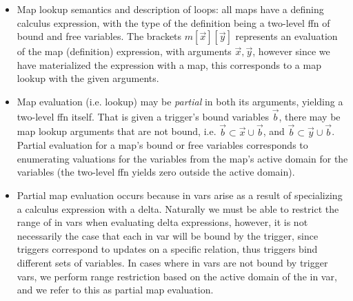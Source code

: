 
\begin{itemize}
  \item Map lookup semantics and description of loops: all maps have a defining
  calculus expression, with the type of the definition being a two-level ffn of
  bound and free variables. The brackets $m[\vec{x}][\vec{y}]$ represents an
  evaluation of the map (definition) expression, with arguments $\vec{x},
  \vec{y}$, however since we have materialized the expression with a map, this
  corresponds to a map lookup with the given arguments.
  
  \item Map evaluation (i.e. lookup) may be \textit{partial} in both its
  arguments, yielding a two-level ffn itself. That is given a trigger's bound
  variables $\vec{b}$, there may be map lookup arguments that are not bound, i.e.
  $\vec{b} \subset \vec{x} \cup \vec{b}$, and
  $\vec{b} \subset \vec{y} \cup \vec{b}$.
  Partial evaluation for a map's bound or free variables corresponds to
  enumerating valuations for the variables from the map's active domain for
  the variables (the two-level ffn yields zero outside the active domain).
  
  \item Partial map evaluation occurs because in vars arise as a result of
  specializing a calculus expression with a delta. Naturally we must be able to
  restrict the range of in vars when evaluating delta expressions, however, it is
  not necessarily the case that each in var will be bound by the trigger, since
  triggers correspond to updates on a specific relation, thus triggers bind
  different sets of variables. In cases where in vars are not bound by trigger
  vars, we perform range restriction based on the active domain of the in var,
  and we refer to this as partial map evaluation.


\end{itemize}
